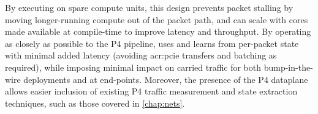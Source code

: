 By executing on spare compute units, this design prevents packet stalling by moving longer-running compute out of the packet path, and can scale with cores made available at compile-time to improve latency and throughput.
By operating as closely as possible to the P4 pipeline, \approachshort{} uses and learns from per-packet state with minimal added latency (avoiding \gls{acr:pcie} transfers and batching as required), while imposing minimal impact on carried traffic for both bump-in-the-wire deployments and at end-points.
Moreover, the presence of the P4 dataplane allows easier inclusion of existing P4 traffic measurement and state extraction techniques, such as those covered in \cref{chap:nets}.






